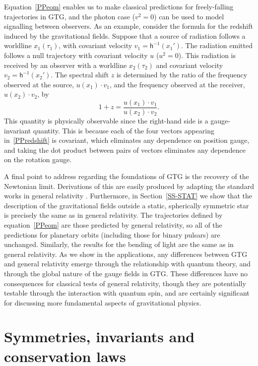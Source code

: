 \documentclass[a4paper]{article}
\numberwithin{equation}{section}
\newcommand{\dt}{\! \cdot \!}
\newcommand{\eqv}{=}
\newcommand{\lih}{\mathsf{h}}
\newcommand{\hu}{\lih}
\begin{document}
Equation~\eqref{PPeom} enables us to make classical predictions for
freely-falling trajectories in GTG, and the photon case ($v^2=0$) can
be used to model signalling between observers.  As an example,
consider the formula for the redshift induced by the gravitational
fields.  Suppose that a source of radiation follows a worldline
$x_1(\tau_1)$, with covariant velocity $v_1=\hu^{-1}(x_1')$.  The
radiation emitted follows a null trajectory with covariant velocity
$u$ ($u^2=0$).  This radiation is received by an observer with a
worldline $x_2(\tau_2)$ and covariant velocity
$v_2=\hu^{-1}(x_2')$.  The spectral shift $z$ is determined by the
ratio of the frequency observed at the source, $u(x_1)\dt v_1$, and
the frequency observed at the receiver, $u(x_2)\dt v_2$, by
%
\begin{equation} 
1 + z \eqv \frac{u(x_1) \dt v_1}{u(x_2) \dt v_2}.
\label{PPredshift}
\end{equation}
%
This quantity is physically observable since the right-hand side is a
gauge-invariant quantity.  This is because each of the four vectors
appearing in~\eqref{PPredshift} is covariant, which eliminates any
dependence on position gauge, and taking the dot product between pairs
of vectors eliminates any dependence on the rotation gauge.


A final point to address regarding the foundations of GTG is the
recovery of the Newtonian limit.  Derivations of this are easily
produced by adapting the standard works in general relativity .
Furthermore, in Section~\ref{SS-STAT} we show that the description of
the gravitational fields outside a static, spherically symmetric star
is precisely the same as in general relativity.  The trajectories
defined by equation~\eqref{PPeom} are those predicted by general
relativity, so all of the predictions for planetary orbits (including
those for binary pulsars) are unchanged.  Similarly, the results for
the bending of light are the same as in general relativity.  As we
show in the applications, any differences between GTG and general
relativity emerge through the relationship with quantum theory, and
through the global nature of the gauge fields in GTG.  These
differences have no consequences for classical tests of general
relativity, though they are potentially testable through the
interaction with quantum spin, and are certainly significant for
discussing more fundamental aspects of gravitational physics.




\section{Symmetries, invariants and conservation laws}
\end{document}

